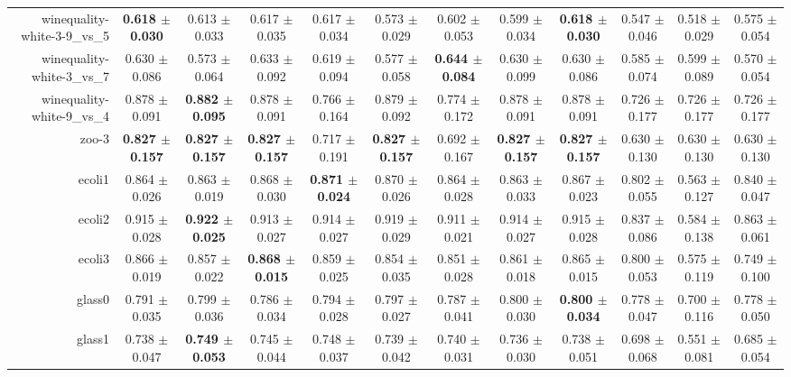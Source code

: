 \begin{table}[!ht]
{\begin{tabular}{r c c c c c c c c c c c}
winequality-white-3-9\_vs\_5 & \textbf{0.618 $\pm$ 0.030} & 0.613 $\pm$ 0.033 & 0.617 $\pm$ 0.035 & 0.617 $\pm$ 0.034 & 0.573 $\pm$ 0.029 & 0.602 $\pm$ 0.053 & 0.599 $\pm$ 0.034 & \textbf{0.618 $\pm$ 0.030} & 0.547 $\pm$ 0.046 & 0.518 $\pm$ 0.029 & 0.575 $\pm$ 0.054 \\
winequality-white-3\_vs\_7 & 0.630 $\pm$ 0.086 & 0.573 $\pm$ 0.064 & 0.633 $\pm$ 0.092 & 0.619 $\pm$ 0.094 & 0.577 $\pm$ 0.058 & \textbf{0.644 $\pm$ 0.084} & 0.630 $\pm$ 0.099 & 0.630 $\pm$ 0.086 & 0.585 $\pm$ 0.074 & 0.599 $\pm$ 0.089 & 0.570 $\pm$ 0.054 \\
winequality-white-9\_vs\_4 & 0.878 $\pm$ 0.091 & \textbf{0.882 $\pm$ 0.095} & 0.878 $\pm$ 0.091 & 0.766 $\pm$ 0.164 & 0.879 $\pm$ 0.092 & 0.774 $\pm$ 0.172 & 0.878 $\pm$ 0.091 & 0.878 $\pm$ 0.091 & 0.726 $\pm$ 0.177 & 0.726 $\pm$ 0.177 & 0.726 $\pm$ 0.177 \\
zoo-3 & \textbf{0.827 $\pm$ 0.157} & \textbf{0.827 $\pm$ 0.157} & \textbf{0.827 $\pm$ 0.157} & 0.717 $\pm$ 0.191 & \textbf{0.827 $\pm$ 0.157} & 0.692 $\pm$ 0.167 & \textbf{0.827 $\pm$ 0.157} & \textbf{0.827 $\pm$ 0.157} & 0.630 $\pm$ 0.130 & 0.630 $\pm$ 0.130 & 0.630 $\pm$ 0.130 \\
ecoli1 & 0.864 $\pm$ 0.026 & 0.863 $\pm$ 0.019 & 0.868 $\pm$ 0.030 & \textbf{0.871 $\pm$ 0.024} & 0.870 $\pm$ 0.026 & 0.864 $\pm$ 0.028 & 0.863 $\pm$ 0.033 & 0.867 $\pm$ 0.023 & 0.802 $\pm$ 0.055 & 0.563 $\pm$ 0.127 & 0.840 $\pm$ 0.047 \\
ecoli2 & 0.915 $\pm$ 0.028 & \textbf{0.922 $\pm$ 0.025} & 0.913 $\pm$ 0.027 & 0.914 $\pm$ 0.027 & 0.919 $\pm$ 0.029 & 0.911 $\pm$ 0.021 & 0.914 $\pm$ 0.027 & 0.915 $\pm$ 0.028 & 0.837 $\pm$ 0.086 & 0.584 $\pm$ 0.138 & 0.863 $\pm$ 0.061 \\
ecoli3 & 0.866 $\pm$ 0.019 & 0.857 $\pm$ 0.022 & \textbf{0.868 $\pm$ 0.015} & 0.859 $\pm$ 0.025 & 0.854 $\pm$ 0.035 & 0.851 $\pm$ 0.028 & 0.861 $\pm$ 0.018 & 0.865 $\pm$ 0.015 & 0.800 $\pm$ 0.053 & 0.575 $\pm$ 0.119 & 0.749 $\pm$ 0.100 \\
glass0 & 0.791 $\pm$ 0.035 & 0.799 $\pm$ 0.036 & 0.786 $\pm$ 0.034 & 0.794 $\pm$ 0.028 & 0.797 $\pm$ 0.027 & 0.787 $\pm$ 0.041 & 0.800 $\pm$ 0.030 & \textbf{0.800 $\pm$ 0.034} & 0.778 $\pm$ 0.047 & 0.700 $\pm$ 0.116 & 0.778 $\pm$ 0.050 \\
glass1 & 0.738 $\pm$ 0.047 & \textbf{0.749 $\pm$ 0.053} & 0.745 $\pm$ 0.044 & 0.748 $\pm$ 0.037 & 0.739 $\pm$ 0.042 & 0.740 $\pm$ 0.031 & 0.736 $\pm$ 0.030 & 0.738 $\pm$ 0.051 & 0.698 $\pm$ 0.068 & 0.551 $\pm$ 0.081 & 0.685 $\pm$ 0.054 \\

\end{tabular}}
\end{table}
